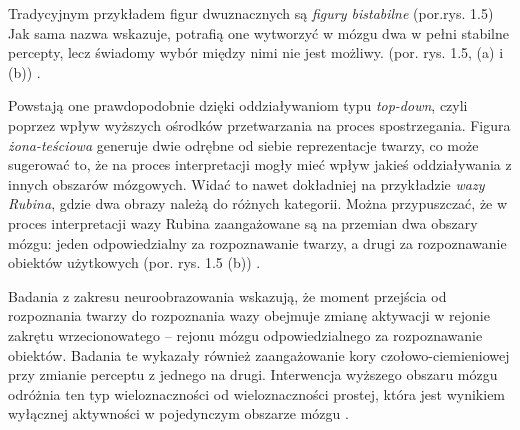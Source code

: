 \documentclass[licencjacka]{kdypl}
\begin{document}
Tradycyjnym przykładem figur dwuznacznych są \textit{figury bistabilne} (por.rys. 1.5)
Jak sama nazwa wskazuje, potrafią one wytworzyć w mózgu dwa w pełni stabilne percepty, lecz świadomy wybór między nimi nie jest możliwy. (por. rys. 1.5, (a) i (b)) \citep[s. 92-93]{Zeki}.


Powstają one prawdopodobnie dzięki oddziaływaniom typu \textit{top-down}, czyli poprzez wpływ wyższych ośrodków przetwarzania na proces spostrzegania. Figura \textit{żona-teściowa} generuje dwie odrębne od siebie reprezentacje twarzy, co może sugerować to, że na proces interpretacji mogły mieć wpływ jakieś oddziaływania z innych obszarów mózgowych. Widać to  nawet dokładniej na przykładzie \textit{wazy Rubina}, gdzie dwa obrazy należą do różnych kategorii. Można przypuszczać, że w proces interpretacji wazy Rubina zaangażowane są na przemian dwa obszary mózgu: jeden odpowiedzialny za rozpoznawanie  twarzy, a drugi za rozpoznawanie obiektów użytkowych (por. rys. 1.5 (b)) \citep[s. 440-441]{Wieloznacznosc}.

Badania z zakresu neuroobrazowania wskazują, że moment przejścia od rozpoznania twarzy do rozpoznania wazy obejmuje zmianę aktywacji w rejonie zakrętu wrzecionowatego -- rejonu mózgu odpowiedzialnego za rozpoznawanie obiektów. Badania te wykazały również zaangażowanie kory czołowo-ciemieniowej przy zmianie perceptu z jednego na drugi. Interwencja wyższego obszaru mózgu odróżnia ten typ wieloznaczności od wieloznaczności prostej, która jest wynikiem wyłącznej aktywności w pojedynczym obszarze mózgu \citep[s. 441]{Wieloznacznosc}.
\end{document}
